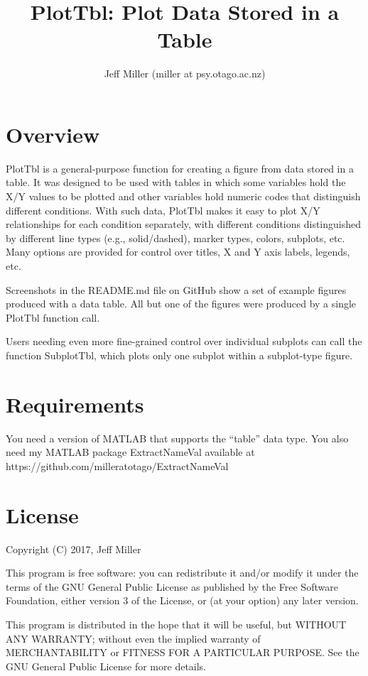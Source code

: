 \documentclass{article}
\title{PlotTbl: Plot Data Stored in a Table}
\author{Jeff Miller (miller at psy.otago.ac.nz)}
\begin{document}
\maketitle
\tableofcontents

\section{Overview}

PlotTbl is a general-purpose function for creating a figure from data stored in a table.
It was designed to be used with tables in which some variables hold the X/Y values to be plotted and
other variables hold numeric codes that distinguish different conditions.
With such data, PlotTbl makes it easy to plot X/Y relationships for each condition
separately, with different conditions distinguished by
different line types (e.g., solid/dashed), marker types, colors, subplots, etc.
Many options are provided for control over titles, X and Y axis labels, legends, etc.

Screenshots in the README.md file on GitHub show a set of example figures produced with a data table.
All but one of the figures were produced by a single PlotTbl function call.

Users needing even more fine-grained control over individual subplots can call the
function SubplotTbl, which plots only one subplot within a subplot-type figure.

\section{Requirements}

You need a version of MATLAB that supports the ``table'' data type.
You also need my MATLAB package ExtractNameVal available at
https://github.com/milleratotago/ExtractNameVal


\section{License}

Copyright (C) 2017, Jeff Miller

This program is free software: you can redistribute it and/or modify
it under the terms of the GNU General Public License as published by
the Free Software Foundation, either version 3 of the License, or
(at your option) any later version.

This program is distributed in the hope that it will be useful,
but WITHOUT ANY WARRANTY; without even the implied warranty of
MERCHANTABILITY or FITNESS FOR A PARTICULAR PURPOSE.  See the
GNU General Public License for more details.
\end{document}
